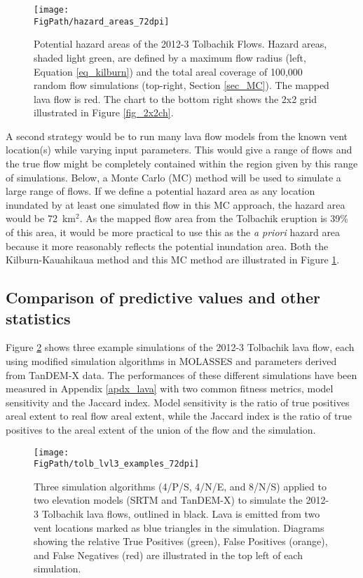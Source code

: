 		\begin{figure}
			\centering
			\texttt{[image: \\FigPath/hazard\_areas\_72dpi]}
			\caption[Potential hazard areas of the 2012-3 Tolbachik Flows]{Potential hazard areas of the 2012-3 Tolbachik Flows. Hazard areas, shaded light green, are defined by a maximum flow radius (left, Equation \ref{eq_kilburn}) and the total areal coverage of 100,000 random flow simulations (top-right, Section \ref{sec_MC}). The mapped lava flow is red. The chart to the bottom right shows the 2x2 grid illustrated in Figure \ref{fig_2x2ch}.}
			\label{fig_hazardarea}
		\end{figure}
	
	A second strategy would be to run many lava flow models from the known vent location(s) while varying input parameters. This would give a range of flows and the true flow might be completely contained within the region given by this range of simulations. Below, a Monte Carlo (MC) method will be used to simulate a large range of flows. If we define a potential hazard area as any location inundated by at least one simulated flow in this MC approach, the hazard area would be 72~km$^2$. As the mapped flow area from the Tolbachik eruption is 39\% of this area, it would be more practical to use this as the \textit{a priori} hazard area because it more reasonably reflects the potential inundation area. Both the Kilburn-Kauahikaua method and this MC method are illustrated in Figure \ref{fig_hazardarea}.				
	
	\subsection{Comparison of predictive values and other statistics}
	Figure \ref{fig_tolbachik} shows three example simulations of the 2012-3 Tolbachik lava flow, each using modified simulation algorithms in MOLASSES and parameters derived from TanDEM-X data. The performances of these different simulations have been measured in Appendix \ref{apdx_lava} with two common fitness metrics, model sensitivity and the Jaccard index. Model sensitivity is the ratio of true positives areal extent to real flow areal extent, while the Jaccard index is the ratio of true positives to the areal extent of the union of the flow and the simulation.	
	
		\begin{figure}[!h]
			\centering
			\texttt{[image: \\FigPath/tolb\_lvl3\_examples\_72dpi]}
			\caption[Three simulation algorithms (4/P/S, 4/N/E, and 8/N/S) applied to two elevation models (SRTM and TanDEM-X) to simulate the 2012-3 Tolbachik lava flows, outlined in black]{Three simulation algorithms (4/P/S, 4/N/E, and 8/N/S) applied to two elevation models (SRTM and TanDEM-X) to simulate the 2012-3 Tolbachik lava flows, outlined in black. Lava is emitted from two vent locations marked as blue triangles in the simulation. Diagrams showing the relative True Positives (green), False Positives (orange), and False Negatives (red) are illustrated in the top left of each simulation.}
			\label{fig_tolbachik}
		\end{figure}
	
